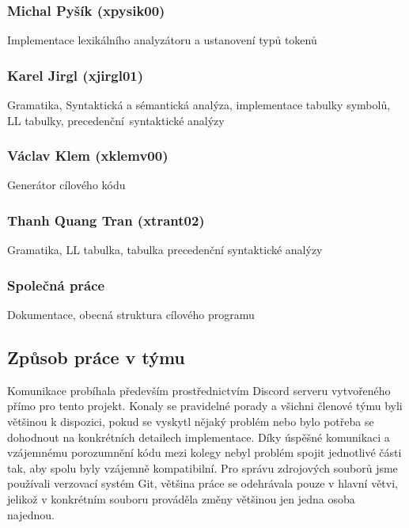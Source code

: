 \documentclass[a4paper, 12pt]{article}
\begin{document}
\subsubsection*{Michal Pyšík (xpysik00)}
Implementace lexikálního analyzátoru a ustanovení typů tokenů

\subsubsection*{Karel Jirgl (xjirgl01)}
Gramatika, Syntaktická a sémantická analýza, implementace tabulky symbolů, LL tabulky, precedenční~syntaktické analýzy

\subsubsection*{Václav Klem (xklemv00) }
Generátor cílového kódu

\subsubsection*{Thanh Quang Tran (xtrant02)}
Gramatika, LL tabulka, tabulka precedenční syntaktické analýzy 

\subsubsection*{Společná práce}
Dokumentace, obecná struktura cílového programu

\subsection{Způsob práce v týmu}
Komunikace probíhala především prostřednictvím Discord serveru vytvořeného přímo pro tento projekt. Konaly se pravidelné porady a všichni členové týmu byli většinou k dispozici, pokud se vyskytl nějaký problém nebo bylo potřeba se dohodnout na konkrétních detailech implementace. Díky úspěšné komunikaci a vzájemnému porozumnění kódu mezi kolegy nebyl problém spojit jednotlivé části tak, aby spolu byly vzájemně kompatibilní. Pro správu zdrojových souborů jsme používali verzovací systém Git, většina práce se odehrávala pouze v hlavní větvi, jelikož v konkrétním souboru prováděla změny většinou jen jedna osoba najednou.

\newpage
\end{document}

